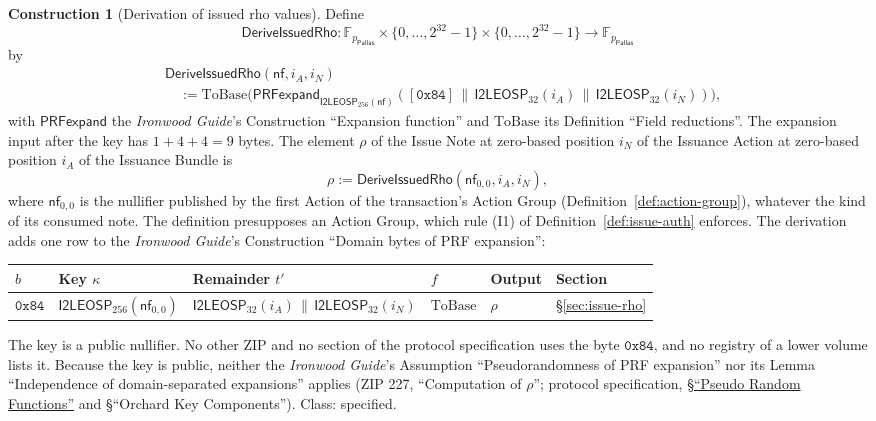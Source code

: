 \documentclass[11pt,a4paper]{article}
\theoremstyle{definition}
\newtheorem{construction}[theorem]{Construction}
\newcommand{\F}{\mathbb{F}}
\newcommand{\nfsym}{\mathsf{nf}}
\newcommand{\Pallas}{\ensuremath{\mathsf{Pallas}}}
\begin{document}
\begin{construction}[Derivation of issued rho values]\label{def:issued-rho}
Define
\[
  \mathsf{DeriveIssuedRho} \colon \F_{p_{\Pallas}} \times
    \{0, \dots, 2^{32} - 1\} \times \{0, \dots, 2^{32} - 1\}
    \to \F_{p_{\Pallas}}
\]
by
\begin{align*}
  &\mathsf{DeriveIssuedRho}(\nfsym, i_A, i_N) \\
  &\quad := \mathrm{ToBase}\bigl(\mathsf{PRFexpand}_{\mathsf{I2LEOSP}_{256}
    (\nfsym)}([\mathtt{0x84}] \,\|\, \mathsf{I2LEOSP}_{32}(i_A) \,\|\,
    \mathsf{I2LEOSP}_{32}(i_N))\bigr),
\end{align*}
with $\mathsf{PRFexpand}$ the \emph{Ironwood Guide}'s Construction
``Expansion function'' and $\mathrm{ToBase}$ its Definition ``Field
reductions''. The expansion input after the key has $1 + 4 + 4 = 9$ bytes.
The element $\rho$ of the Issue Note at zero-based position $i_N$ of the
Issuance Action at zero-based position $i_A$ of the Issuance Bundle is
\[
  \rho := \mathsf{DeriveIssuedRho}(\nfsym_{0,0}, i_A, i_N),
\]
where $\nfsym_{0,0}$ is the nullifier published by the first Action of the
transaction's Action Group (Definition~\ref{def:action-group}), whatever
the kind of its consumed note. The definition presupposes an Action Group,
which rule (I1) of Definition~\ref{def:issue-auth} enforces. The derivation
adds one row to the \emph{Ironwood Guide}'s Construction ``Domain bytes of
PRF expansion'':
\begin{center}\small
\begin{tabular}{@{}llllll@{}}
\toprule
$b$ & Key $\kappa$ & Remainder $t'$ & $f$ & Output & Section \\
\midrule
$\mathtt{0x84}$ & $\mathsf{I2LEOSP}_{256}(\nfsym_{0,0})$
  & $\mathsf{I2LEOSP}_{32}(i_A) \,\|\, \mathsf{I2LEOSP}_{32}(i_N)$
  & $\mathrm{ToBase}$ & $\rho$ & \S\ref{sec:issue-rho} \\
\bottomrule
\end{tabular}
\end{center}
The key is a public nullifier. No other ZIP and no section of the protocol
specification uses the byte $\mathtt{0x84}$, and no registry of a lower
volume lists it. Because the key is public, neither the \emph{Ironwood
Guide}'s Assumption ``Pseudorandomness of PRF expansion'' nor its Lemma
``Independence of domain-separated expansions'' applies (ZIP 227,
``Computation of $\rho$''; protocol specification,
\href{https://zips.z.cash/protocol/protocol.pdf\#concreteprfs}{\S``Pseudo
Random Functions''} and \S``Orchard Key Components''). Class: specified.
\end{construction}
\end{document}
